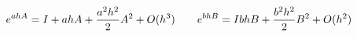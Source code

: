 \documentclass[preview]{standalone}
\begin{document}
\begin{align*}
\special{dvisvgm:raw <g id='unique000'>}e^{ahA} = I + ahA + \frac{a^2h^2}{2}A^2+O(h^3) \qquad e^{bhB} = I bhB + \frac{b^2h^2}{2}B^2+ O(h^2)\special{dvisvgm:raw </g>}
\end{align*}
\end{document}
